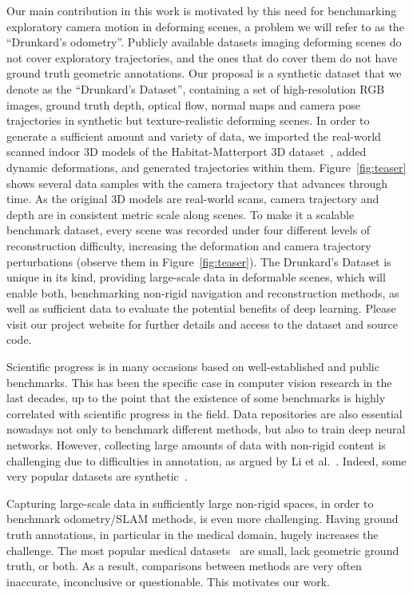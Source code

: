 \documentclass{article}
\begin{document}
Our main contribution in this work is motivated by this need for benchmarking exploratory camera motion in deforming scenes, a problem we will refer to as the ``Drunkard's odometry''. Publicly available datasets imaging deforming scenes do not cover exploratory trajectories, and the ones that do cover them do not have ground truth geometric annotations. Our proposal is a synthetic dataset that we denote as the ``Drunkard's Dataset'', containing a set of high-resolution RGB images, ground truth depth, optical flow, normal maps and camera pose trajectories in synthetic but texture-realistic deforming scenes. In order to generate a sufficient amount and variety of data, we imported the real-world scanned indoor 3D models of the Habitat-Matterport 3D dataset~\cite{ramakrishnan2021habitat}, added dynamic deformations, and generated trajectories within them. 
Figure~\ref{fig:teaser} shows several data samples with the camera trajectory that advances through time. As the original 3D models are real-world scans, camera trajectory and depth are in consistent metric scale along scenes. To make it a scalable benchmark dataset, every scene was recorded under four different levels of reconstruction difficulty, increasing the deformation and camera trajectory perturbations (observe them in Figure~\ref{fig:teaser}). The Drunkard’s Dataset is unique in its kind, providing large-scale data in deformable scenes, which will enable both, benchmarking non-rigid navigation and reconstruction methods, as well as sufficient data to evaluate the potential benefits of deep learning. Please visit our project website for further details and access to the dataset and source code.

Scientific progress is in many occasions based on well-established and public benchmarks. This has been the specific case in computer vision research in the last decades, up to the point that the existence of some benchmarks is highly correlated with scientific progress in the field. Data repositories are also essential nowadays not only to benchmark different methods, but also to train deep neural networks. However, collecting large amounts of data with non-rigid content is challenging due to difficulties in annotation, as argued by Li et al.~\cite{li2021topologically}. Indeed, some very popular datasets are synthetic~\cite{butler2012naturalistic,mayer2016large}. 

Capturing large-scale data in sufficiently large non-rigid spaces, in order to benchmark odometry/SLAM methods, is even more challenging. Having ground truth annotations, in particular in the medical domain, hugely increases the challenge. The most popular medical datasets~\cite{stoyanov2005soft,stoyanov2012stereoscopic,jensen2021benchmark,azagra2022endomapper} are small, lack geometric ground truth, or both. As a result, comparisons between methods are very often inaccurate, inconclusive or questionable. This motivates our work.
\end{document}
